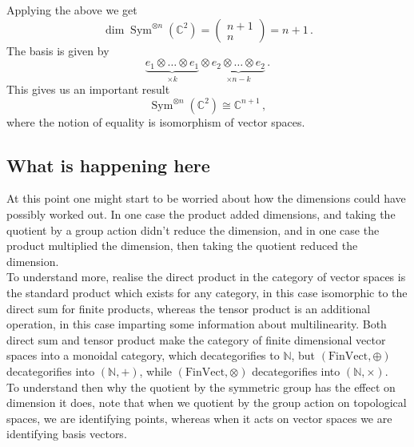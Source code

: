 \documentclass{article}
\begin{document}
\begin{example}
	Applying the above we get 
	\[
	\dim \operatorname{Sym}^{\otimes n}(\mathbb{C}^2) = \begin{pmatrix}
	n + 1 \\ n
	\end{pmatrix} = n+1 \, .
	\]
	The basis is given by 
	\[
	\underbrace{e_1 \otimes \dots \otimes e_1}_{\times k} \otimes  \underbrace{e_2 \otimes \dots \otimes e_2}_{\times n-k} \, . 
	\]
	This gives us an important result
	\begin{equation}
	\operatorname{Sym}^{\otimes n}(\mathbb{C}^2) \cong \mathbb{C}^{n+1} \, , \tag{B}
	\end{equation}
	where the notion of equality is isomorphism of vector spaces. 
\end{example}

\subsection{What is happening here}
At this point one might start to be worried about how the dimensions could have possibly worked out. In one case the product added dimensions, and taking the quotient by a group action didn't reduce the dimension, and in one case the product multiplied the dimension, then taking the quotient reduced the dimension. \\
To understand more, realise the direct product in the category of vector spaces is the standard product which exists for any category, in this case isomorphic to the direct sum for finite products, whereas the tensor product is an additional operation, in this case imparting some information about multilinearity. Both direct sum and tensor product make the category of finite dimensional vector spaces into a monoidal category, which decategorifies to $\mathbb{N}$, but $(\text{FinVect}, \oplus)$ decategorifies into $(\mathbb{N}, +)$, while $(\text{FinVect}, \otimes)$ decategorifies into $(\mathbb{N}, \times)$. \\
To understand then why the quotient by the symmetric group has the effect on dimension it does, note that when we quotient by the group action on topological spaces, we are identifying points, whereas when it acts on vector spaces we are identifying basis vectors. 



\end{document}

